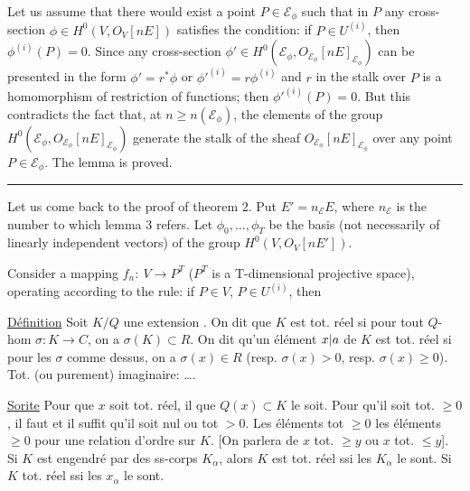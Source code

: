 Let us assume that there would exist a point $P\in\mathcal E_\phi$ such that in $P$ any cross-section $\phi\in H^0(V,O_V[nE])$ satisfies the condition: if $P\in U^{(i)}$, then $\phi^{(i)}(P)=0$. Since any cross-section $\phi'\in H^0(\mathcal E_\phi,O_{\mathcal E_\phi}[nE]_{\mathcal E_\phi})$ can be presented in the form $\phi'=r^*\phi$ or $\phi'^{(i)}=r\phi^{(i)}$ and $r$ in the stalk over $P$ is a homomorphism of restriction of functions; then $\phi'^{(i)}(P)=0$. But this contradicts the fact that, at $n\ge n(\mathcal E_\phi)$, the elements of the group $H^0(\mathcal E_\phi,O_{\mathcal E_\phi}[nE]_{\mathcal E_\phi})$ generate the stalk of the sheaf $O_{\mathcal E_\phi}[nE]_{\mathcal E_\phi}$ over any point $P\in\mathcal E_\phi$. The lemma is proved.\ \rule{0.5em}{1em}

Let us come back to the proof of theorem 2. Put $E'=n_{\mathcal E}E$, where $n_{\mathcal E}$ is the number to which lemma 3 refers. Let $\phi_0,\ldots,\phi_T$ be the basis (not necessarily of linearly independent vectors) of the group $H^0(V,O_V[nE'])$.

Consider a mapping $f_n:\ V\to P^T$ ($P^T$ is a T-dimensional projective space), operating according to the rule: if $P\in V$, $P\in U^{(i)}$, then

\uline{Définition} Soit $K/Q$ une extension  . On dit que $K$ est tot. réel si pour tout $Q$-hom $\sigma:K\to C$, on a $\sigma(K)\subset R$. On dit qu'un élément ${x|a}$ de $K$ est tot. réel  si pour les $\sigma$ comme dessus, on a $\sigma(x)\in R$ (resp. $\sigma(x)>0$, resp. $\sigma(x)\ge0$). Tot. (ou purement) imaginaire: \ldots.

\uline{Sorite} Pour que $x$ soit tot. réel, il  que $Q(x)\subset K$ le soit. Pour qu'il soit tot. $\ge0$, il faut et il suffit qu'il soit nul ou tot $>0$. Les éléments tot $\ge0$   les éléments $\ge0$ pour une relation d'ordre sur $K$. [On parlera de $x$ tot. $\ge y$ ou $x$ tot. $\le y$]. Si $K$ est engendré par des ss-corps $K_\alpha$, alors $K$ est tot. réel ssi les $K_\alpha$ le sont. Si  $K$ tot. réel ssi  les $x_\alpha$ le sont.

